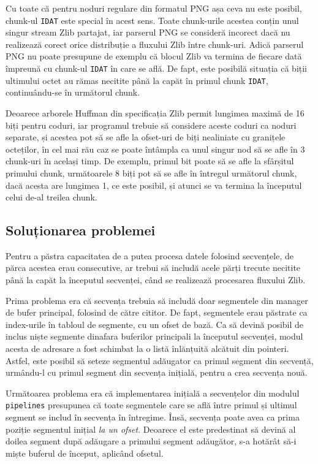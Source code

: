 \documentclass[a4paper,12pt]{report}
\begin{document}
Cu toate că pentru noduri regulare din formatul \ac{PNG} așa ceva nu este posibil,
chunk-ul \texttt{IDAT} este special în acest sens.
Toate chunk-urile acestea conțin unul singur stream Zlib partajat,
iar parserul \ac{PNG} se consideră incorect dacă nu realizează corect
orice distribuție a fluxului Zlib între chunk-uri.
Adică parserul \ac{PNG} nu poate presupune de exemplu că blocul Zlib va termina de fiecare dată
împreună cu chunk-ul \texttt{IDAT} în care se află.
De fapt, este posibilă situația că biții ultimului octet au rămas necitite până la capăt
în primul chunk \texttt{IDAT}, continuându-se în următorul chunk.

Deoarece arborele Huffman din specificația Zlib permit lungimea maximă de 16 biți pentru coduri,
iar programul trebuie să considere aceste coduri ca noduri separate,
și acestea pot să se afle la ofset-uri de biți nealiniate cu granițele octeților,
în cel mai rău caz se poate întâmpla ca unul singur nod să se afle în 3 chunk-uri în același timp.
De exemplu, primul bit poate să se afle la sfârșitul primului chunk,
următoarele 8 biți pot să se afle în întregul următorul chunk, dacă acesta are lungimea 1, ce este posibil,
și atunci se va termina la începutul celui de-al treilea chunk.

\subsection{Soluționarea problemei}

Pentru a păstra capacitatea de a putea procesa datele folosind secvențele,
de părca acestea erau consecutive, ar trebui să includă acele părți trecute necitite până la capăt
la începutul secvenței, când se realizează procesarea fluxului Zlib.

Prima problema era că secvența trebuia să includă doar segmentele din manager de bufer principal,
folosind de către cititor.
De fapt, segmentele erau păstrate ca index-urile în tabloul de segmente, cu un ofset de bază.
Ca să devină posibil de inclus niște segmente dinafara buferilor principali la începutul secvenței,
modul acesta de adresare a fost schimbat la o listă înlănțuită alcătuit din pointeri.
Astfel, este posibil să seteze segmentul adăugator ca primul segment din secvență, urmându-l cu
primul segment din secvența inițială, pentru a crea secvența nouă.

Următoarea problema era că implementarea inițială a secvențelor din modulul \texttt{pipelines} presupunea
că toate segmentele care se află între primul și ultimul segment se includ în secvența în întregime.
Însă, secvența poate avea ca prima poziție segmentul inițial \textit{la un ofset}.
Deoarece el este predestinat să devină al doilea segment după adăugare a primului segment adăugător,
s-a hotărât să-i miște buferul de început, aplicând ofsetul.
\end{document}
